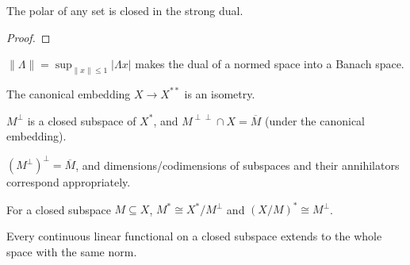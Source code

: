 \begin{theorem}
  \label{thm:polar-closed}
  \leanok
  The polar of any set is closed in the strong dual.
\end{theorem}
\begin{proof}
  \leanok
\end{proof}


\begin{theorem}
  \label{thm:dualNorm-banach}
  \leanok
  $\|\Lambda\| = \sup_{\|x\| \le 1} |\Lambda x|$ makes the dual of a
  normed space into a Banach space.
\end{theorem}

\begin{theorem}
  \label{thm:canonical-embedding-isometry}
  \leanok
  The canonical embedding $X \to X^{**}$ is an isometry.
\end{theorem}

\begin{theorem}
  \label{thm:annihilator-double}
  \leanok
  $M^\perp$ is a closed subspace of $X^*$, and
  $M^{\perp\perp} \cap X = \overline{M}$ (under the canonical
  embedding).
\end{theorem}

\begin{theorem}
  \label{thm:annihilator-codim}
  \leanok
  $(M^\perp)^\perp = \overline{M}$, and dimensions/codimensions of
  subspaces and their annihilators correspond appropriately.
\end{theorem}

\begin{theorem}
  \label{thm:dual-subspace-quotient}
  \leanok
  For a closed subspace $M \subseteq X$,
  $M^* \cong X^*/M^\perp$ and $(X/M)^* \cong M^\perp$.
\end{theorem}

\begin{theorem}
  \label{thm:hahn-banach-norm-preserving}
  \leanok
  Every continuous linear functional on a closed subspace extends to
  the whole space with the same norm.
\end{theorem}

